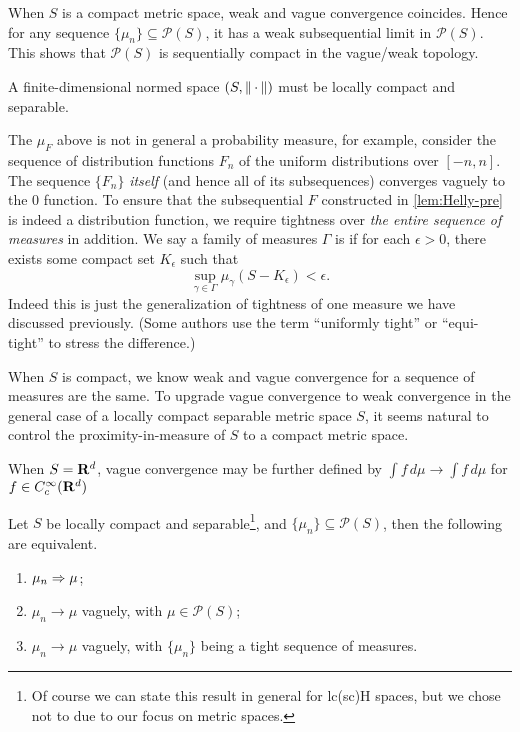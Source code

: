 \begin{cor} \label{cor:seq-compact-space-prob-meas}
    When $S$ is a compact metric space, weak and vague convergence coincides. Hence for any sequence $\{\mu_n\} \subseteq \mathcal P(S)$, it has a weak subsequential limit in $\mathcal P(S)$. This shows that $\mathcal P(S)$ is sequentially compact in the vague/weak topology.
\end{cor}

A finite-dimensional normed space $(S,\lVert \,\cdot\, \rVert)$ must be locally compact and separable.

The $\mu_F$ above is not in general a probability measure, for example, consider the sequence of distribution functions $F_n$ of the uniform distributions over $[-n,n]$. The sequence $\{F_n\}$ \emph{itself} (and hence all of its subsequences) converges vaguely to the $0$ function. To ensure that the subsequential $F$ constructed in \cref{lem:Helly-pre} is indeed a distribution function, we require tightness over \emph{the entire sequence of measures} in addition. We say a family of measures $\Gamma$ is  if for each $\epsilon > 0$, there exists some compact set $K_\epsilon$ such that \[
    \sup_{\gamma \in \Gamma} \mu_\gamma (S - K_\epsilon) < \epsilon.
\] Indeed this is just the generalization of tightness of one measure we have discussed previously. (Some authors use the term ``uniformly tight'' or ``equi-tight'' to stress the difference.)

When $S$ is compact, we know weak and vague convergence for a sequence of measures are the same. To upgrade vague convergence to weak convergence in the general case of a locally compact separable metric space $S$, it seems natural to control the proximity-in-measure of $S$ to a compact metric space.

    When $S = \mathbf{R}^d$, vague convergence may be further defined by $
            \int f\,d\mu \to \int f\,d\mu 
    $ for $f \in C_c^\infty(\mathbf{R}^d)$

\begin{thm} \label{thm:vague-to-weak}
    Let $S$ be locally compact and separable\footnote{Of course we can state this result in general for lc(sc)H spaces, but we chose not to due to our focus on metric spaces.}, and $\{\mu_n\} \subseteq \mathcal P(S)$, then the following are equivalent. \begin{enumerate}
        \item $\mu_n \Rightarrow \mu$;
        \item $\mu_n \to \mu$ vaguely, with $\mu\in \mathcal P(S)$;
        \item $\mu_n \to \mu$ vaguely, with $\{\mu_n\}$ being a tight sequence of measures.
    \end{enumerate}
\end{thm}

